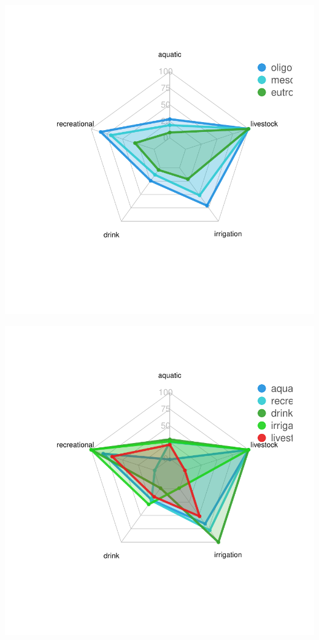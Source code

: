 \documentclass[]{article}
\begin{document}
\begin{center}\includegraphics{figures/radar plot  -1} \end{center}

\begin{center}\includegraphics{figures/radar plot  -2} \end{center}
\end{document}
